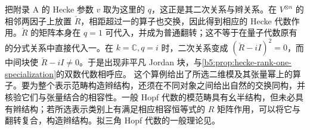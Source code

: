 把附录 A 的 Hecke 参数 \(v\) 取为这里的 \(q\)，这正是其二次关系与辫关系。在 \(V^{\otimes n}\) 的相邻两因子上放置 \(\check R\)，相距超过一的算子也交换，因此得到相应的 Hecke 代数作用。\(\check R\) 的矩阵本身在 \(q=1\) 可代入，并成为普通翻转；这不等于在量子代数原有的分式关系中直接代入一。在 \(k=\mathbb C,q=i\) 时，二次关系变成 \((\check R-iI)^2=0\)，而中间块使 \(\check R-iI\ne0\)。于是出现非平凡 Jordan 块，与\cref{b5:prop:hecke-rank-one-specialization}的双数代数相呼应。
\ProseParagraphBreak
这个算例给出了所选二维模及其张量幂上的算子。要为整个表示范畴构造辫结构，还须在不同对象之间给出自然的交换同构，并核验它们与张量结合的相容性。一般 Hopf 代数的模范畴具有幺半结构，但未必具有辫结构；若所选表示类别上有满足相应相容恒等式的 \(R\) 矩阵作用，可以将它与翻转复合，构造辫结构。拟三角 Hopf 代数的一般理论见\cite[Section 8.3, Definition 8.3.1, pp. 198--199]{EtingofEtAl2015TensorCategories}。
